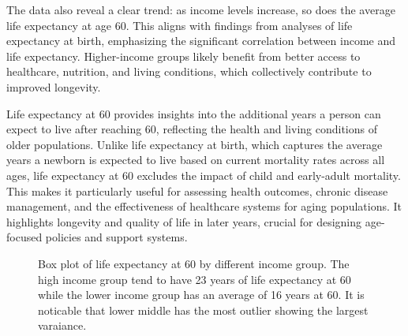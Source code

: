 \documentclass[
  letterpaper,
  DIV=11,
  numbers=noendperiod]{scrartcl}
\begin{document}
The data also reveal a clear trend: as income levels increase, so does
the average life expectancy at age 60. This aligns with findings from
analyses of life expectancy at birth, emphasizing the significant
correlation between income and life expectancy. Higher-income groups
likely benefit from better access to healthcare, nutrition, and living
conditions, which collectively contribute to improved longevity.

Life expectancy at 60 provides insights into the additional years a
person can expect to live after reaching 60, reflecting the health and
living conditions of older populations. Unlike life expectancy at birth,
which captures the average years a newborn is expected to live based on
current mortality rates across all ages, life expectancy at 60 excludes
the impact of child and early-adult mortality. This makes it
particularly useful for assessing health outcomes, chronic disease
management, and the effectiveness of healthcare systems for aging
populations. It highlights longevity and quality of life in later years,
crucial for designing age-focused policies and support systems.

\begin{figure}


\caption{\label{fig-lea60}Box plot of life expectancy at 60 by different
income group. The high income group tend to have 23 years of life
expectancy at 60 while the lower income group has an average of 16 years
at 60. It is noticable that lower middle has the most outlier showing
the largest varaiance.}

\end{figure}%
\end{document}
